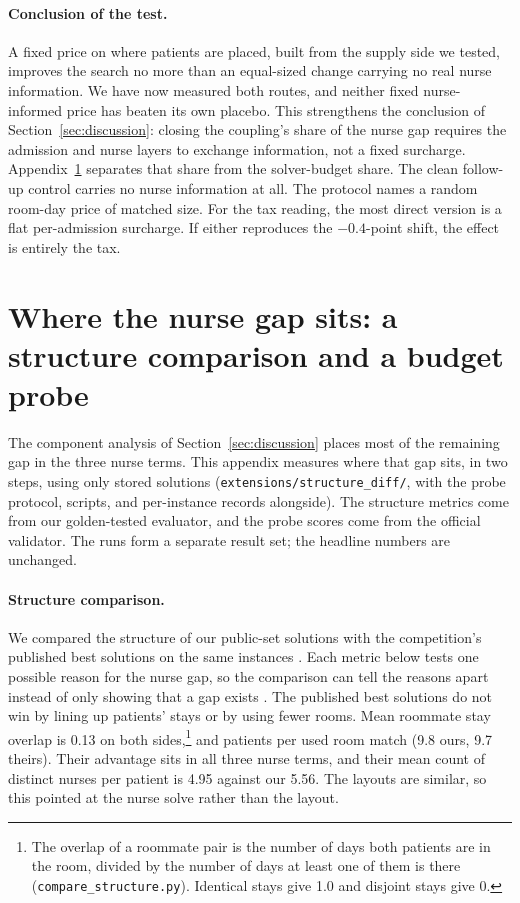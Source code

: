 \documentclass[11pt]{article}
\newcommand{\anote}[1]{\footnote{#1}}
\begin{document}
	\paragraph{Conclusion of the test.} A fixed price on where patients are placed, built from the supply side we tested, improves the search no more than an equal-sized change carrying no real nurse information.
	We have now measured both routes, and neither fixed nurse-informed price has beaten its own placebo. This strengthens the conclusion of Section~\ref{sec:discussion}: closing the coupling's share of the nurse gap requires the admission and nurse layers to exchange information, not a fixed surcharge. Appendix~\ref{app:structure} separates that share from the
	solver-budget share. The clean follow-up control carries no nurse information at all. The protocol names a random room-day price of matched size. For the tax reading, the most direct version is a flat per-admission surcharge. If either reproduces the $-0.4$-point shift, the effect is entirely
	the tax.

	\section{Where the nurse gap sits: a structure comparison and a budget probe}\label{app:structure}
	The component analysis of Section~\ref{sec:discussion} places most of the remaining gap in the
	three nurse terms. This appendix measures where that gap sits, in two steps, using only stored
	solutions (\texttt{extensions/structure\_diff/}, with the probe protocol, scripts, and
	per-instance records alongside). The structure metrics come from our golden-tested evaluator,
	and the probe scores come from the official validator. The runs form a separate result set; the headline numbers are unchanged.

	\paragraph{Structure comparison.} We compared the structure of our public-set solutions with
	the competition's published best solutions on the same instances \citep{ihtc2024site}. Each metric below tests one possible reason for the nurse gap, so the comparison can tell the reasons apart instead of only showing that a gap exists \citep{hooker1995}. The published best solutions do not win by lining up patients' stays or by using fewer rooms. Mean roommate stay overlap is 0.13 on both sides,\anote{The overlap of a roommate pair is the number of days both patients are in the room, divided by the number of days at least one of them is there (\texttt{compare\_structure.py}). Identical stays give 1.0 and disjoint stays give 0.} and patients per used room match (9.8 ours, 9.7 theirs). Their advantage sits in all three nurse terms, and their mean count of distinct nurses per patient is 4.95 against our 5.56. The layouts are similar, so this pointed at the nurse solve rather than the layout.
\end{document}
